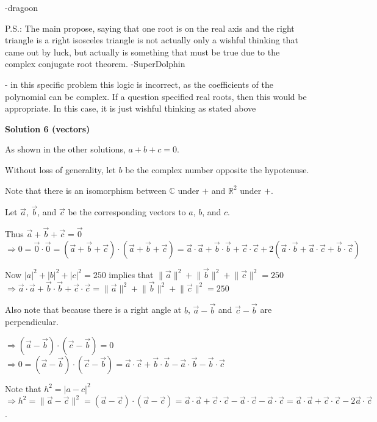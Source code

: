\begin{enumerate}
 -dragoon

 P.S.: The main propose, saying that one root is on the real axis and the right triangle is a right isosceles triangle is not actually only a wishful thinking that came out by luck, but actually is something that must be true due to the complex conjugate root theorem. -SuperDolphin

 - in this specific problem this logic is incorrect, as the coefficients of the polynomial can be complex. If a question specified real roots, then this would be appropriate. In this case, it is just wishful thinking as stated above

 



\textbf{Solution 6 (vectors)}

As shown in the other solutions, $a+b+c = 0$.

 Without loss of generality, let $b$ be the complex number opposite the hypotenuse.

 Note that there is an isomorphism between $\mathbb{C}$ under $+$ and $\mathbb{R}^2$ under $+$.

 Let $\Vec{a}$, $\Vec{b}$, and $\Vec{c}$ be the corresponding vectors to $a$, $b$, and $c$.

 Thus $\Vec{a} + \Vec{b} + \Vec{c} = \Vec{0}$
$\Rightarrow 0 = \Vec{0}\cdot \Vec{0} = (\Vec{a} + \Vec{b} + \Vec{c})\cdot (\Vec{a} + \Vec{b} + \Vec{c}) = \Vec{a}\cdot \Vec{a} + \Vec{b}\cdot \Vec{b} + \Vec{c}\cdot \Vec{c} + 2(\Vec{a}\cdot \Vec{b} + \Vec{a}\cdot \Vec{c} + \Vec{b}\cdot \Vec{c})$

 Now $|a|^2 + |b|^2 + |c|^2 = 250$ implies that $\lVert \Vec{a}\rVert^2 + \lVert \Vec{b}\rVert^2 + \lVert \Vec{c}\rVert^2 = 250$
$\Rightarrow \Vec{a}\cdot \Vec{a} + \Vec{b}\cdot \Vec{b} + \Vec{c}\cdot \Vec{c} = \lVert \Vec{a}\rVert^2 + \lVert \Vec{b}\rVert^2 + \lVert \Vec{c}\rVert^2 = 250$

 Also note that because there is a right angle at $b$, $\Vec{a} - \Vec{b}$ and $\Vec{c} - \Vec{b}$ are perpendicular.

 $\Rightarrow (\Vec{a} - \Vec{b})\cdot (\Vec{c} - \Vec{b}) = 0$
$\Rightarrow 0 = (\Vec{a} - \Vec{b})\cdot (\Vec{c} - \Vec{b}) = \Vec{a}\cdot \Vec{c} + \Vec{b} \cdot \Vec{b} - \Vec{a} \cdot \Vec{b} - \Vec{b} \cdot \Vec{c}$

 Note that $h^2 = |a-c|^2$
$\Rightarrow h^2 = \lVert \Vec{a} - \Vec{c} \rVert^2 = (\Vec{a} - \Vec{c})\cdot (\Vec{a} - \Vec{c}) = \Vec{a} \cdot \Vec{a} + \Vec{c}\cdot \Vec{c} - \Vec{a}\cdot \Vec{c} - \Vec{a}\cdot \Vec{c} = \Vec{a} \cdot \Vec{a} + \Vec{c}\cdot \Vec{c} - 2\Vec{a}\cdot \Vec{c}$.


\end{enumerate}
